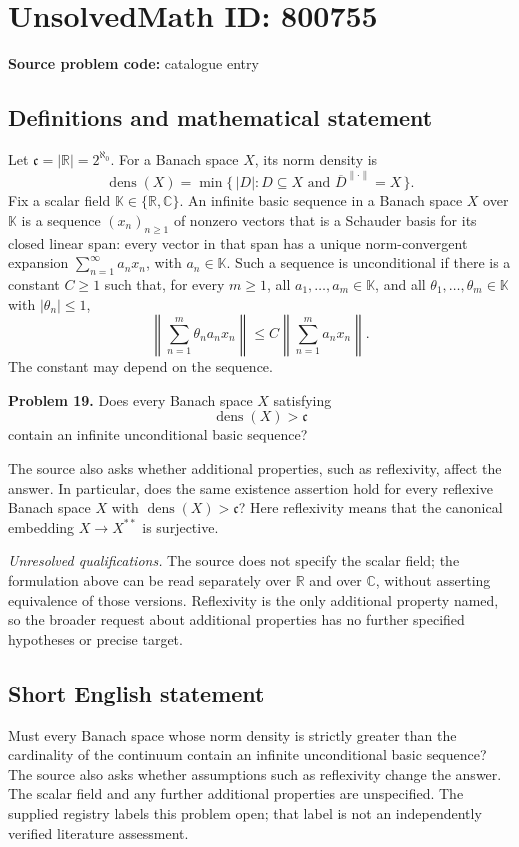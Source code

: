 \documentclass[11pt]{article}
\newcommand{\R}{\mathbb{R}}
\newcommand{\C}{\mathbb{C}}
\begin{document}
\section*{UnsolvedMath ID: 800755}
\textbf{Source problem code:} catalogue entry
\subsection{Definitions and mathematical statement}
Let \(\mathfrak c=|\R|=2^{\aleph_0}\). For a Banach space \(X\), its norm density is
\[
\operatorname{dens}(X)=\min\{\,|D|:D\subseteq X\text{ and }\overline D^{\|\cdot\|}=X\,\}.
\]
Fix a scalar field \(\mathbb K\in\{\R,\C\}\). An infinite basic sequence in a Banach space \(X\) over \(\mathbb K\) is a sequence \((x_n)_{n\geq1}\) of nonzero vectors that is a Schauder basis for its closed linear span: every vector in that span has a unique norm-convergent expansion \(\sum_{n=1}^{\infty}a_nx_n\), with \(a_n\in\mathbb K\). Such a sequence is unconditional if there is a constant \(C\geq1\) such that, for every \(m\geq1\), all \(a_1,\ldots,a_m\in\mathbb K\), and all \(\theta_1,\ldots,\theta_m\in\mathbb K\) with \(|\theta_n|\leq1\),
\[
\left\|\sum_{n=1}^{m}\theta_na_nx_n\right\|
\leq C\left\|\sum_{n=1}^{m}a_nx_n\right\|.
\]
The constant may depend on the sequence.

\textbf{Problem 19.} Does every Banach space \(X\) satisfying
\[
\operatorname{dens}(X)>\mathfrak c
\]
contain an infinite unconditional basic sequence?

The source also asks whether additional properties, such as reflexivity, affect the answer. In particular, does the same existence assertion hold for every reflexive Banach space \(X\) with \(\operatorname{dens}(X)>\mathfrak c\)? Here reflexivity means that the canonical embedding \(X\to X^{**}\) is surjective.

\textit{Unresolved qualifications.} The source does not specify the scalar field; the formulation above can be read separately over \(\R\) and over \(\C\), without asserting equivalence of those versions. Reflexivity is the only additional property named, so the broader request about additional properties has no further specified hypotheses or precise target.
\subsection{Short English statement}
Must every Banach space whose norm density is strictly greater than the cardinality of the continuum contain an infinite unconditional basic sequence? The source also asks whether assumptions such as reflexivity change the answer. The scalar field and any further additional properties are unspecified. The supplied registry labels this problem open; that label is not an independently verified literature assessment.
\end{document}

